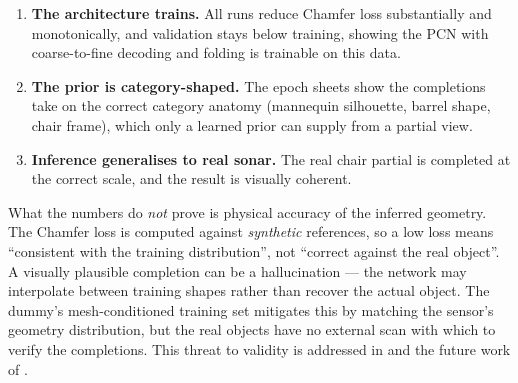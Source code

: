 \begin{enumerate}
  \item \textbf{The architecture trains.} All runs reduce Chamfer loss
  substantially and monotonically, and validation stays below training,
  showing the PCN with coarse-to-fine decoding and folding is trainable on
  this data.
  \item \textbf{The prior is category-shaped.} The epoch sheets show the
  completions take on the correct category anatomy (mannequin silhouette,
  barrel shape, chair frame), which only a learned prior can supply from a
  partial view.
  \item \textbf{Inference generalises to real sonar.} The real chair partial
  is completed at the correct scale, and the result is visually coherent.
\end{enumerate}

What the numbers do \emph{not} prove is physical accuracy of the inferred
geometry. The Chamfer loss is computed against \emph{synthetic} references, so
a low loss means ``consistent with the training distribution'', not
``correct against the real object''. A visually plausible completion can be a
hallucination --- the network may interpolate between training shapes rather
than recover the actual object. The dummy's mesh-conditioned training set
mitigates this by matching the sensor's geometry distribution, but the real
\suop{} objects have no external scan with which to verify the completions.
This threat to validity is addressed in  and the future
work of .
